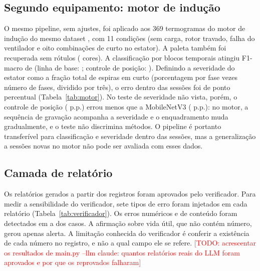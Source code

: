 \documentclass[11pt,a4paper]{article}
\newcommand{\todo}[1]{\textcolor{red}{[TODO: #1]}}
\begin{document}
\subsection{Segundo equipamento: motor de indução}
O mesmo pipeline, sem ajustes, foi aplicado aos 369 termogramas do motor de indução do mesmo dataset \cite{najafi2020motor}, com 11 condições (sem carga, rotor travado, falha do ventilador e oito combinações de curto no estator). A paleta também foi recuperada sem rótulos (\MotorCores{} cores). A classificação por blocos temporais atingiu F1-macro de \MotorFUm{} (linha de base: \MotorFUmTriv{}; controle de posição: \MotorFUmPos). Definindo a severidade do estator como a fração total de espiras em curto (porcentagem por fase vezes número de fases, dividido por três), o erro dentro das sessões foi de \MotorMAE{} ponto percentual (Tabela~\ref{tab:motor}). No teste de severidade não vista, porém, o controle de posição (\MotorSevPos{} p.p.) errou menos que a MobileNetV3 (\MotorSevMob{} p.p.): no motor, a sequência de gravação acompanha a severidade e o enquadramento muda gradualmente, e o teste não discrimina métodos. O pipeline é portanto transferível para classificação e severidade dentro das sessões, mas a generalização a sessões novas no motor não pode ser avaliada com esses dados.

\begin{table}[t]
\centering
\caption{Motor de indução: F1-macro das 11 condições (blocos) e erro da severidade do estator em pontos percentuais}
\label{tab:motor}
\small
\end{table}

\subsection{Camada de relatório}
Os \RelAprovados{} relatórios gerados a partir dos registros foram aprovados pelo verificador. Para medir a sensibilidade do verificador, sete tipos de erro foram injetados em cada relatório (Tabela~\ref{tab:verificador}). Os erros numéricos e de conteúdo foram detectados em \VerifMin{} a \VerifMax{} dos casos. A afirmação sobre vida útil, que não contém número, gerou apenas alerta. A limitação conhecida do verificador é conferir a existência de cada número no registro, e não a qual campo ele se refere. \todo{acrescentar os resultados de main.py --llm claude: quantos relatórios reais do LLM foram aprovados e por que os reprovados falharam}

\begin{table}[t]
\centering
\caption{Sensibilidade do verificador a erros injetados}
\label{tab:verificador}
\small
\end{table}
\end{document}
